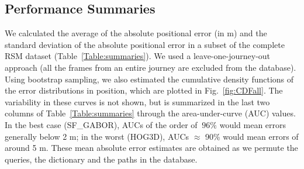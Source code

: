 \subsection{Performance Summaries}
We calculated the average of the absolute positional error (in m) and the standard deviation of the absolute positional error in a subset of the complete RSM dataset (Table~\ref{Table:summaries}). We  used a leave-one-journey-out approach (all the frames from an entire journey are excluded from the database).  Using bootstrap sampling, we also estimated the cumulative density functions of the error distributions in position, which are plotted in Fig.~\ref{fig:CDFall}. The variability in these curves is not shown, but is summarized in the last two columns of Table~\ref{Table:summaries} through the area-under-curve (AUC) values. In the best case (SF\_GABOR), AUCs of the order of $~96\%$ would mean errors generally below 2 m; in the worst (HOG3D), AUCs $\approx$ 90\% would mean errors of around 5 m.  These  mean absolute error estimates are obtained as we permute the queries, the dictionary and the paths in the database. 


